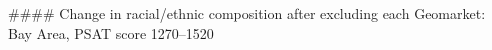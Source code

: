 #### Change in racial/ethnic composition after excluding each Geomarket: Bay Area, PSAT score 1270–1520
